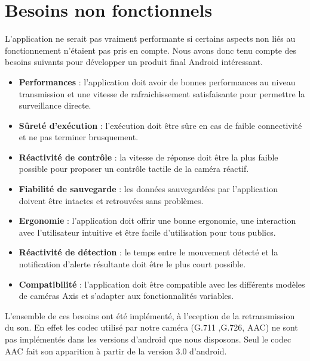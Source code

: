 \section{Besoins non fonctionnels}
L'application ne serait pas vraiment performante si certains aspects non liés au fonctionnement n'étaient pas pris en compte. Nous avons donc tenu compte des besoins suivants pour développer un produit final Android intéressant.
\begin{itemize}
  \item {\bf Performances} : l'application doit avoir de bonnes performances au
  niveau transmission et une vitesse de rafraichissement satisfaisante pour permettre la surveillance directe.
  \item {\bf Sûreté d'exécution} : l'exécution doit être sûre en cas de faible
  connectivité et ne pas terminer brusquement.
  \item {\bf Réactivité de contrôle} : la vitesse de réponse doit être la plus
  faible possible pour proposer un contrôle tactile de la caméra réactif.
  \item {\bf Fiabilité de sauvegarde} : les données sauvegardées par
  l'application doivent être intactes et retrouvées sans problèmes.
  \item {\bf Ergonomie} : l'application doit offrir une bonne ergonomie, une
  interaction avec l'utilisateur intuitive et être facile d'utilisation pour tous publics.
  \item {\bf Réactivité de détection} : le temps entre le mouvement détecté et
  la notification d'alerte résultante doit être le plus court possible.
  \item {\bf Compatibilité} : l'application doit être compatible avec les
  différents modèles de caméras Axis et s'adapter aux fonctionnalités variables.
\end{itemize}
L'ensemble de ces besoins ont été implémenté, à l'eception de la retransmission
du son. En effet les codec utilisé par notre caméra (G.711 ,G.726, AAC) ne sont
pas implémentés dans les versions d'android que nous disposons. Seul le codec AAC fait son
apparition à partir de la version 3.0 d'android.
\clearpage